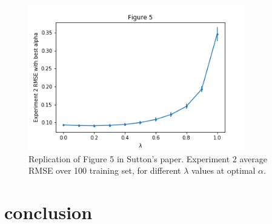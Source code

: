 \documentclass[conference]{IEEEtran}
\begin{document}
	\begin{figure}
		\includegraphics[height=2.5in]{figure5.png} 
		\caption{Replication of Figure 5 in Sutton's paper. Experiment 2 average RMSE over 100 training set, for different $\lambda$ values at optimal $\alpha$.}
		\label{fig:3}
	\end{figure}
	
\section{conclusion}

	


\end{document}
